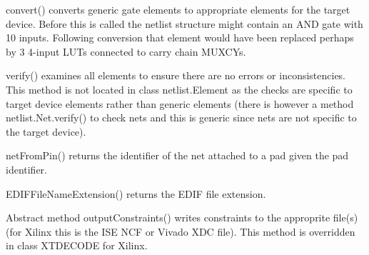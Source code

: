 convert() converts generic gate elements to appropriate elements
for the target device. Before this is called the netlist structure
might contain an AND gate with 10 inputs. Following conversion that
element would have been replaced perhaps by 3 4-input LUTs connected
to carry chain MUXCYs.

verify() examines all elements to ensure there are no errors or
inconsistencies. This method is not located in class netlist.Element
as the checks are specific to target device elements rather than
generic elements (there is however a method netlist.Net.verify()
to check nets and this is generic since nets are not specific to
the target device).

netFromPin() returns the identifier of the net attached to a pad
given the pad identifier.

EDIFFileNameExtension() returns the EDIF file extension.


Abstract method outputConstraints() writes constraints to the approprite file(s)
(for Xilinx this is the ISE NCF or Vivado XDC file). This method is overridden in
class XTDECODE for Xilinx.

